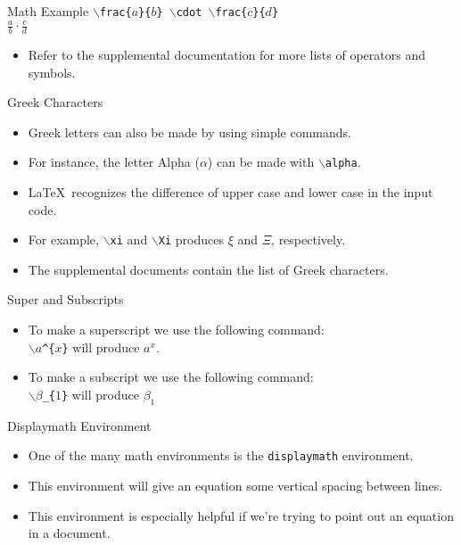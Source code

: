 \documentclass[pdf]{prosper}
\begin{document}
\begin{slide}{Math Example}
	\texttt{$\backslash$frac\{$a$\}\{$b$\} $\backslash$cdot $\backslash$frac\{$c$\}\{$d$\}} \\
	$\frac{a}{b} \cdot \frac{c}{d}$
	\begin{itemize}
		\item Refer to the supplemental documentation for more lists of operators and symbols.
	\end{itemize}
\end{slide}
\begin{slide}{Greek Characters}
	\begin{itemize}
		\item Greek letters can also be made by using simple commands.
		\item For instance, the letter Alpha ($\alpha$) can be made with \texttt{$\backslash$alpha}.
		\item \LaTeX\ recognizes the difference of upper case and lower case in the input code.
		\item For example, \texttt{$\backslash$xi} and \texttt{$\backslash$Xi} produces $\xi$ and $\Xi$, respectively.
		\item The supplemental documents contain the list of Greek characters.
	\end{itemize}
\end{slide}
\begin{slide}{Super and Subscripts}
	\begin{itemize}
		\item To make a superscript we use the following command: \\
		\texttt{$\backslash$$a$\^{}\{$x$\}} will produce $a^{x}$.
		\item To make a subscript we use the following command: \\
		\texttt{$\backslash$$\beta$\_\{$1$\}} will produce $\beta_{1}$ \\
	\end{itemize}
\end{slide}
\begin{slide}{Displaymath Environment}
	\begin{itemize}
		\item One of the many math environments is the \texttt{displaymath} environment.
		\item This environment will give an equation some vertical spacing between lines.
		\item This environment is especially helpful if we're trying to point out an equation in a document.
	\end{itemize}
\end{slide}
\end{document}
